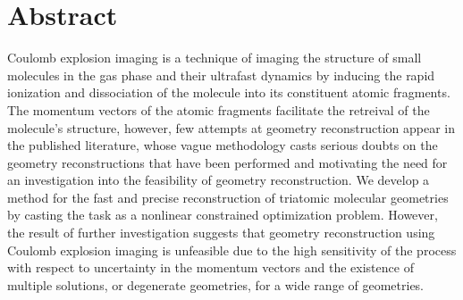 \begingroup
\let\clearpage\relax
\let\cleardoublepage\relax
\let\cleardoublepage\relax


\chapter*{Abstract}
Coulomb explosion imaging is a technique of imaging the structure of small molecules in the gas phase and their ultrafast dynamics by inducing the rapid ionization and dissociation of the molecule into its constituent atomic fragments. The momentum vectors of the atomic fragments facilitate the retreival of the molecule's structure, however, few attempts at geometry reconstruction appear in the published literature, whose vague methodology casts serious doubts on the geometry reconstructions that have been performed and motivating the need for an investigation into the feasibility of geometry reconstruction. We develop a method for the fast and precise reconstruction of triatomic molecular geometries by casting the task as a nonlinear constrained optimization problem. However, the result of further investigation suggests that geometry reconstruction using Coulomb explosion imaging is unfeasible due to the high sensitivity of the process with respect to uncertainty in the momentum vectors and the existence of multiple solutions, or degenerate geometries, for a wide range of geometries.

\vfill
\endgroup			
\vfill
